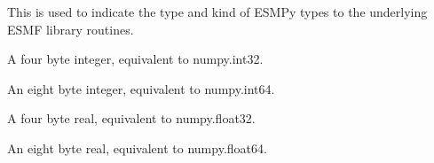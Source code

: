 \documentclass[letterpaper,10pt,english]{sphinxmanual}
\begin{document}
\begin{fulllineitems}
\label{\detokenize{TypeKind:ESMF.api.constants.TypeKind}}
This is used to indicate the type and kind of ESMPy types to the
underlying ESMF library routines.

\begin{fulllineitems}
\label{\detokenize{TypeKind:ESMF.api.constants.TypeKind.I4}}
A four byte integer, equivalent to numpy.int32.

\end{fulllineitems}


\begin{fulllineitems}
\label{\detokenize{TypeKind:ESMF.api.constants.TypeKind.I8}}
An eight byte integer, equivalent to numpy.int64.

\end{fulllineitems}


\begin{fulllineitems}
\label{\detokenize{TypeKind:ESMF.api.constants.TypeKind.R4}}
A four byte real, equivalent to numpy.float32.

\end{fulllineitems}


\begin{fulllineitems}
\label{\detokenize{TypeKind:ESMF.api.constants.TypeKind.R8}}
An eight byte real, equivalent to numpy.float64.

\end{fulllineitems}


\end{fulllineitems}
\end{document}
